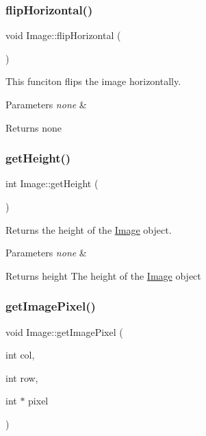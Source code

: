 \subsubsection{\texorpdfstring{flip\+Horizontal()}{flipHorizontal()}}
{\footnotesize\ttfamily void Image\+::flip\+Horizontal (\begin{DoxyParamCaption}{ }\end{DoxyParamCaption})}

This funciton flips the image horizontally.


\begin{DoxyParams}{Parameters}
{\em none} & \\
\hline
\end{DoxyParams}
\begin{DoxyReturn}{Returns}
none 
\end{DoxyReturn}
\mbox{\label{class_image_aa4e1f064e5e1f3f04ad605408f1ec3af}} 
\subsubsection{\texorpdfstring{get\+Height()}{getHeight()}}
{\footnotesize\ttfamily int Image\+::get\+Height (\begin{DoxyParamCaption}{ }\end{DoxyParamCaption})}

Returns the height of the \hyperlink{class_image}{Image} object.


\begin{DoxyParams}{Parameters}
{\em none} & \\
\hline
\end{DoxyParams}
\begin{DoxyReturn}{Returns}
height The height of the \hyperlink{class_image}{Image} object 
\end{DoxyReturn}
\mbox{\label{class_image_a06bf6921136ef94ef30a788dbf609ce9}} 
\subsubsection{\texorpdfstring{get\+Image\+Pixel()}{getImagePixel()}}
{\footnotesize\ttfamily void Image\+::get\+Image\+Pixel (\begin{DoxyParamCaption}\item[{int}]{col,  }\item[{int}]{row,  }\item[{int $\ast$}]{pixel }\end{DoxyParamCaption})}

